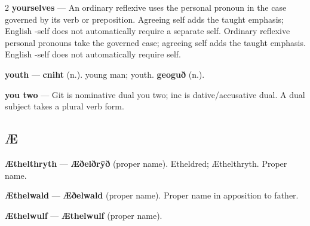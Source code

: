 \begin{multicols}{2}
\textbf{yourselves} — An ordinary reflexive uses the personal pronoun in the case governed by its verb or preposition. Agreeing self adds the taught emphasis; English -self does not automatically require a separate self. Ordinary reflexive personal pronouns take the governed case; agreeing self adds the taught emphasis. English -self does not automatically require self.\par
\textbf{youth} — \textbf{cniht} (n.). young man; youth. \textbf{geoguð} (n.).\par
\textbf{you two} — Git is nominative dual you two; inc is dative/accusative dual. A dual subject takes a plural verb form.\par
\subsection*{Æ}
\textbf{Æthelthryth} — \textbf{Æðelðrȳð} (proper name). Etheldred; Æthelthryth. Proper name.\par
\textbf{Æthelwald} — \textbf{Æðelwald} (proper name). Proper name in apposition to father.\par
\textbf{Æthelwulf} — \textbf{Æthelwulf} (proper name).\par
\end{multicols}

\par\label{end-glossary-english}
\clearpage\endgroup
